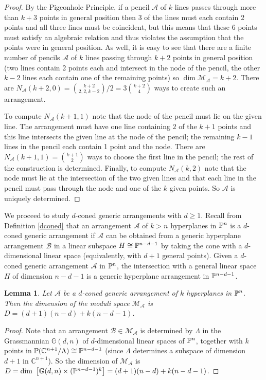 \documentclass[12pt]{article}
\theoremstyle{plain}
\newtheorem{lemma}[theorem]{Lemma}
\theoremstyle{definition}
\newcommand{\A}{\mathcal{A}}
\newcommand{\M}{\mathcal{M}}
\newcommand{\MLA}{\M_{\A}}
\newcommand{\C}{\mathbb{C}}
\newcommand{\G}{\mathbb{G}}
\renewcommand{\P}{\ensuremath \mathbb{P}}
\begin{document}
\begin{proof}
  By the Pigeonhole Principle, if a pencil $\A$ of $k$ lines passes
  through more than $k+3$ points in general position then 3 of the
  lines must each contain 2 points and all three lines must be
  coincident, but this means that these 6 points must satisfy an
  algebraic relation and thus violates the assumption that the points
  were in general position. As well, it is easy to see that there
  are a finite number of pencils $\A$ of $k$ lines  passing through $k+2$ points
  in general position (two lines contain 2 points each and intersect
  in the node of the pencil, the other $k-2$ lines each contain one of
  the remaining points) so $\dim \MLA = k+2$. There are $N_\A(k+2,0) =
  \binom{k+2}{2,2,k-2}/2 = 3 \binom{k+2}{4}$ ways to create such an
  arrangement.

  To compute $N_\A(k+1,1)$ note that the node of the pencil must lie
  on the given line. The arrangement must have one line containing $2$
  of the $k+1$ points and this line intersects the given line at the
  node of the pencil; the remaining $k-1$ lines in the pencil each
  contain 1 point and the node. There are $N_\A(k+1,1) = \binom{k+1}{2}$ ways to
  choose the first line in the pencil; the rest of the construction is determined. Finally, to compute
  $N_\A(k,2)$ note that the node must lie at the intersection of the
  two given lines and that each line in the pencil must pass through
  the node and one of the $k$ given points. So $\A$ is uniquely
  determined. \end{proof}

We proceed to study $d$-coned generic arrangements with $d\geq 1$. Recall
from Definition \ref{dconed} that an arrangement $\A$ of $k>n$
hyperplanes in $\P^n$ is a $d$-coned generic arrangement if $\A$ can
be obtained from a generic hyperplane arrangement $\mathcal{B}$ in a
linear subspace $H \cong \P^{n-d-1}$ by taking the cone with a
$d$-dimensional linear space (equivalently, with $d+1$ general
points). Given a $d$-coned generic arrangement $\A$ in $\P^n$, the
intersection with a general linear space $H$ of dimension $n-d-1$ is a
generic hyperplane arrangement in $\P^{n-d-1}$.


\begin{lemma} \label{dimlemma} Let $\A$ be a $d$-coned generic
  arrangement of $k$ hyperplanes in $\P^n$. Then the dimension of the
  moduli space $\M_\A$ is $D = (d+1)(n-d) + k(n-d-1)$.
\end{lemma}

\begin{proof}
Note that an arrangement $\mathcal{B} \in \M_\A$ is determined by $\Lambda$ in
the Grassmannian $\G(d,n)$ of $d$-dimensional linear spaces of
$\P^{n}$, together with $k$ points in $\P(\C^{n+1}/\Lambda) \cong
\P^{n-d-1}$ (since $\Lambda$ determines a subspace of dimension $d+1$
in $\C^{n+1}$). So the dimension of $\M_\A$ is $D = \text{dim } \left[ \G(d,n)
\times (\P^{n-d-1})^k \right] = (d+1)(n-d) + k(n-d-1)$. 
\end{proof}
\end{document}
